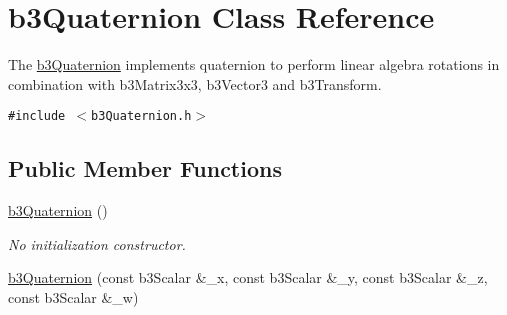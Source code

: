 \hypertarget{classb3_quaternion}{
\section{b3Quaternion Class Reference}
\label{classb3_quaternion}
}
The \hyperlink{classb3_quaternion}{b3Quaternion} implements quaternion to perform linear algebra rotations in combination with b3Matrix3x3, b3Vector3 and b3Transform.  


{\tt \#include $<$b3Quaternion.h$>$}

\subsection*{Public Member Functions}
\begin{CompactItemize}
\item 
\hypertarget{classb3_quaternion_e4b6e029b2e987e463249e4e14f5da4d}{
\hyperlink{classb3_quaternion_e4b6e029b2e987e463249e4e14f5da4d}{b3Quaternion} ()}
\label{classb3_quaternion_e4b6e029b2e987e463249e4e14f5da4d}

\begin{CompactList}\small\item\em No initialization constructor. \item\end{CompactList}\item 
\hypertarget{classb3_quaternion_0f440961db46489c88d5624b9865402b}{
\hyperlink{classb3_quaternion_0f440961db46489c88d5624b9865402b}{b3Quaternion} (const b3Scalar \&\_\-x, const b3Scalar \&\_\-y, const b3Scalar \&\_\-z, const b3Scalar \&\_\-w)}
\label{classb3_quaternion_0f440961db46489c88d5624b9865402b}


\end{CompactItemize}
